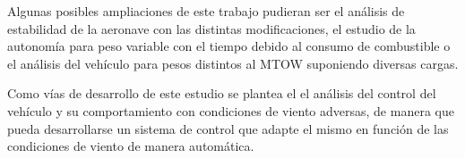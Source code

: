 Algunas posibles ampliaciones de este trabajo pudieran ser el análisis de estabilidad de la aeronave con las distintas modificaciones, el estudio de la autonomía para peso variable con el tiempo debido al consumo de combustible o el análisis del vehículo para pesos distintos al MTOW suponiendo diversas cargas.

Como vías de desarrollo de este estudio se plantea el el análisis del control del vehículo y su comportamiento con condiciones de viento adversas, de manera que pueda desarrollarse un sistema de control que adapte el mismo en función de las condiciones de viento de manera automática.
